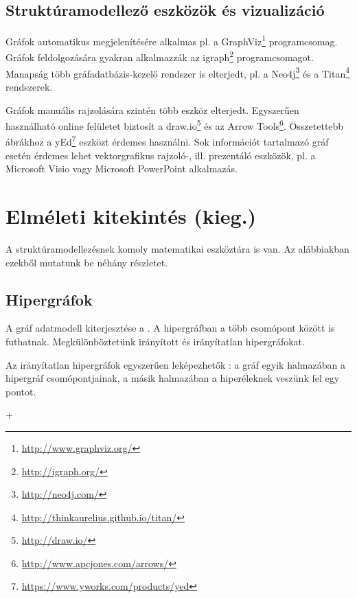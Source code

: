 \subsection{Struktúramodellező eszközök és vizualizáció}

Gráfok automatikus megjelenítésére alkalmas pl. a GraphViz\footnote{\url{http://www.graphviz.org/}} programcsomag. Gráfok feldolgozására gyakran alkalmazzák az igraph\footnote{\url{http://igraph.org/}} programcsomagot. Manapság több gráfadatbázis-kezelő rendszer is elterjedt, pl. a Neo4j\footnote{\url{http://neo4j.com/}} és a Titan\footnote{\url{http://thinkaurelius.github.io/titan/}} rendszerek.

Gráfok manuális rajzolására szintén több eszköz elterjedt. Egyszerűen használható online felületet biztosít a draw.io\footnote{\url{http://draw.io/}} és az Arrow Tools\footnote{\url{http://www.apcjones.com/arrows/}}. Összetettebb ábrákhoz a yEd\footnote{\url{https://www.yworks.com/products/yed}} eszközt érdemes használni. Sok információt tartalmazó gráf esetén érdemes lehet vektorgrafikus rajzoló-, ill. prezentáló eszközök, pl. a Microsoft Visio vagy Microsoft PowerPoint alkalmazás.


\section{Elméleti kitekintés (kieg.)}

A struktúramodellezésnek komoly matematikai eszköztára is van. Az alábbiakban ezekből mutatunk be néhány részletet.

\subsection{Hipergráfok}

A gráf adatmodell kiterjesztése a . A hipergráfban a  több csomópont között is futhatnak. Megkülönböztetünk irányított és irányítatlan hipergráfokat.

Az irányítatlan hipergráfok egyszerűen leképezhetők : a gráf egyik halmazában a hipergráf csomópontjainak, a másik halmazában a hiperéleknek veszünk fel egy pontot.

 + 



